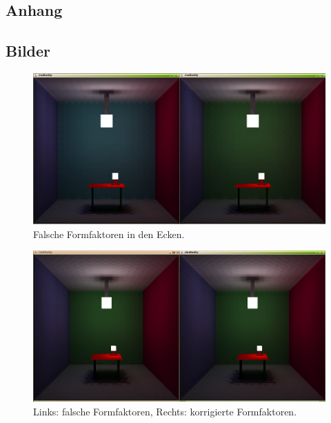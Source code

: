 \documentclass[final,a4paper,11pt,notitlepage,halfparskip]{scrreprt}
\begin{document}
\begin{appendix}
\chapter{Anhang}
\section{Bilder}
  \begin{figure}[htb]
    \centering
    \includegraphics[width=12cm]{img/wrong_ff.png}
    \caption{Falsche Formfaktoren in den Ecken.}
    \label{fig:ff_corner}
  \end{figure}
  \begin{figure}[htb]
    \centering
    \includegraphics[width=12cm]{img/correct_ff.png}
    \caption{Links: falsche Formfaktoren, Rechts: korrigierte
    Formfaktoren.}
    \label{fig:ff_correct}
  \end{figure}
\end{appendix}
\end{document}
